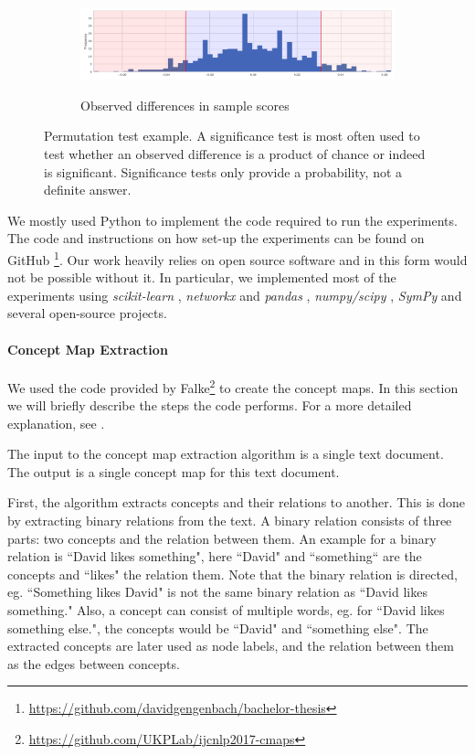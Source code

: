\begin{figure}[htb!]
  \begin{subfigure}[t]{\linewidth}
  {\includegraphics[width=1\textwidth]{assets/figures/permutation_test/distribution.pdf}\label{fig:permutation_test_distribution}}
  \caption{Observed differences in sample scores}
  \end{subfigure}
  \caption[Example: Permutation Test]{Permutation test example. A significance test is most often used to test whether an observed difference is a product of chance or indeed is significant. Significance tests only provide a probability, not a definite answer.}
  \label{fig:example_permutation_test}
\end{figure}


We mostly used Python to implement the code required to run the experiments.
The code and instructions on how set-up the experiments can be found on GitHub \footnote{\url{https://github.com/davidgengenbach/bachelor-thesis}}.
Our work heavily relies on open source software and in this form would not be possible without it.
In particular, we implemented most of the experiments using \textit{scikit-learn} \cite{Pedregosa2012}, \textit{networkx} \cite{Hagberg2008} and \textit{pandas} \cite{McKinney2010}, \textit{numpy/scipy} \cite{VanderWalt2011}, \textit{SymPy} \cite{Meurer2017} and several open-source projects.

\paragraph{Concept Map Extraction}
We used the code provided by Falke\footnote{\url{https://github.com/UKPLab/ijcnlp2017-cmaps}}  to create the concept maps.
In this section we will briefly describe the steps the code performs. For a more detailed explanation, see \cite{Falke2017}.

The input to the concept map extraction algorithm is a single text document. The output is a single concept map for this text document.

First, the algorithm extracts concepts and their relations to another.
This is done by extracting binary relations from the text. A binary relation consists of three parts: two concepts and the relation between them. An example for a binary relation is ``David likes something", here ``David" and ``something`` are the concepts and ``likes" the relation them. Note that the binary relation is directed, eg. ``Something likes David" is not the same binary relation as ``David likes something."
Also, a concept can consist of multiple words, eg. for ``David likes something else.", the concepts would be ``David" and ``something else".
The extracted concepts are later used as node labels, and the relation between them as the edges between concepts.

